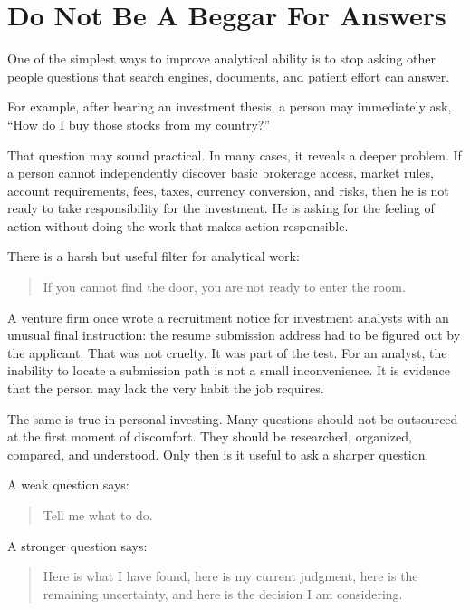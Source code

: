 \section*{Do Not Be A Beggar For Answers}

One of the simplest ways to improve analytical ability is to stop asking other people questions that search engines, documents, and patient effort can answer.

For example, after hearing an investment thesis, a person may immediately ask, ``How do I buy those stocks from my country?''

That question may sound practical. In many cases, it reveals a deeper problem. If a person cannot independently discover basic brokerage access, market rules, account requirements, fees, taxes, currency conversion, and risks, then he is not ready to take responsibility for the investment. He is asking for the feeling of action without doing the work that makes action responsible.

There is a harsh but useful filter for analytical work:

\begin{quote}
If you cannot find the door, you are not ready to enter the room.
\end{quote}

A venture firm once wrote a recruitment notice for investment analysts with an unusual final instruction: the resume submission address had to be figured out by the applicant. That was not cruelty. It was part of the test. For an analyst, the inability to locate a submission path is not a small inconvenience. It is evidence that the person may lack the very habit the job requires.

The same is true in personal investing. Many questions should not be outsourced at the first moment of discomfort. They should be researched, organized, compared, and understood. Only then is it useful to ask a sharper question.

A weak question says:

\begin{quote}
Tell me what to do.
\end{quote}

A stronger question says:

\begin{quote}
Here is what I have found, here is my current judgment, here is the remaining uncertainty, and here is the decision I am considering.
\end{quote}

